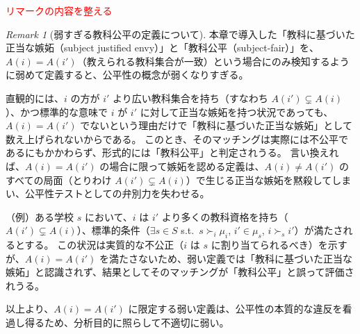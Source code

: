 \documentclass[12pt, a4paper]{article}
\theoremstyle{definition}
\theoremstyle{remark}
\newtheorem{remark}{Remark}
\theoremstyle{plain}
\begin{document}







\textcolor{red}{リマークの内容を整える}

\bigbreak

\begin{remark}[弱すぎる教科公平の定義について]
本章で導入した「教科に基づいた正当な嫉妬（subject justified envy）」と「教科公平（subject-fair）」を、
$A(i)=A(i')$（教えられる教科集合が一致）という場合にのみ検知するように弱めて定義すると、公平性の概念が弱くなりすぎる。

直観的には、$i$ の方が $i'$ より広い教科集合を持ち（すなわち $A(i') \subsetneq A(i)$）、かつ標準的な意味で $i$ が $i'$ に対して正当な嫉妬を持つ状況であっても、$A(i)=A(i')$ でないという理由だけで「教科に基づいた正当な嫉妬」として数え上げられないからである。
このとき、そのマッチングは実際には不公平であるにもかかわらず、形式的には「教科公平」と判定されうる。
言い換えれば、$A(i)=A(i')$ の場合に限って嫉妬を認める定義は、$A(i)\neq A(i')$ のすべての局面（とりわけ $A(i') \subsetneq A(i)$）で生じる正当な嫉妬を黙殺してしまい、公平性テストとしての弁別力を失わせる。

（例）ある学校 $s$ において、$i$ は $i'$ より多くの教科資格を持ち（$A(i') \subsetneq A(i)$）、標準的条件（$\exists s\in S$ s.t.\ $s \succ_i \mu_i$, $i'\in \mu_s$, $i \succ_s i'$）が満たされるとする。
この状況は実質的な不公正（$i$ は $s$ に割り当てられるべき）を示すが、$A(i)=A(i')$ を満たさないため、弱い定義では「教科に基づいた正当な嫉妬」と認識されず、結果としてそのマッチングが「教科公平」と誤って評価されうる。

以上より、$A(i)=A(i')$ に限定する弱い定義は、公平性の本質的な違反を看過し得るため、分析目的に照らして不適切に弱い。
\end{remark}
\end{document}
